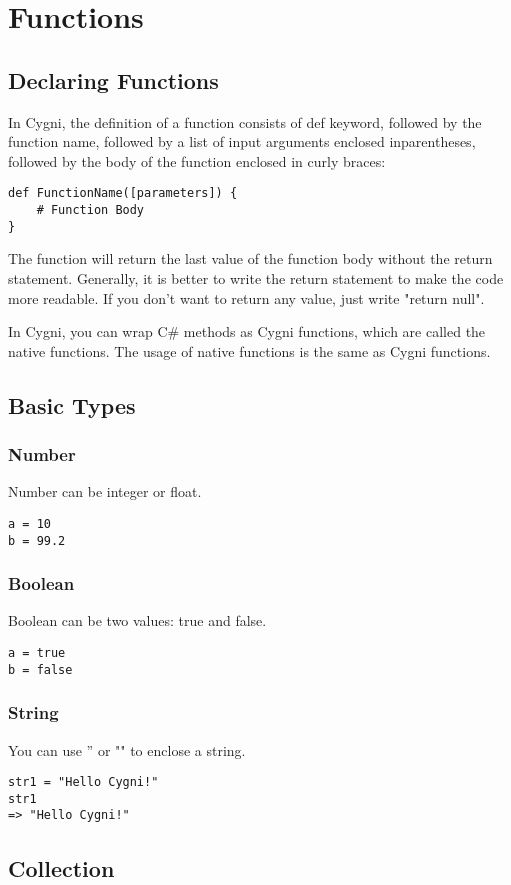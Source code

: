 \chapter{Functions}
\section{Declaring Functions}
In Cygni, the definition of a function consists of def keyword, followed by the function name, followed by a list of input arguments enclosed inparentheses, followed by the body of the function enclosed in curly braces:
\begin{lstlisting}
def FunctionName([parameters]) {
	# Function Body
}
\end{lstlisting}
The function will return the last value of the function body without the return statement. Generally, it is better to write the return statement to make the code more readable. If you don't want to return any value, just write "return null".

In Cygni, you can wrap C\# methods as Cygni functions, which are called the native functions. The usage of native functions is the same as Cygni functions.
\section{Basic Types}
\subsection{Number}
	Number can be integer or float.
\begin{lstlisting}
a = 10
b = 99.2
\end{lstlisting}

\subsection{Boolean}
	Boolean can be two values: true and false.
\begin{lstlisting}
a = true
b = false
\end{lstlisting}

\subsection{String}
	You can use '' or "" to enclose a string.
\begin{lstlisting}
str1 = "Hello Cygni!"
str1
=> "Hello Cygni!"
\end{lstlisting}

\section{Collection}
